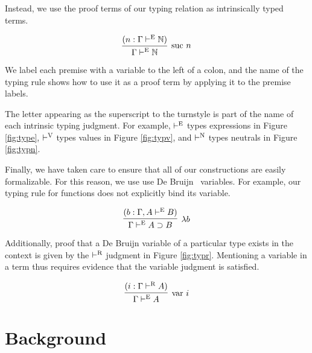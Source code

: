 \documentclass[preprint,nonatbib]{sigplanconf}
\numberwithin{mysubdfn}{mydfn}
\newcommand{\reffig}[1]{Figure \ref{fig:#1}}
\def\arr{\supset}
\def\lam{\lambda}
\def\nat{\mathbb{N}}
\newcommand{\turn}[1]{\vdash^\con{#1}}
\newcommand{\con}[1]{\textmd{#1}}
\newcommand{\fun}[1]{\textmd{#1}}
\newcommand{\type}[1]{\Gamma \turn{E} #1}
\newcommand{\ctype}[2]{\Gamma , #1 \turn{E} #2}
\newcommand{\typr}[1]{\Gamma \turn{R} #1}
\begin{document}
Instead, we use the proof terms of our typing relation as
intrinsically typed terms.

$$
\infer
  [\con{suc} ~ n]
  {\type{\nat}}
{
  (n : \type{\nat})
}
$$

We label each premise with a variable to
the left of a colon, and the name of the typing rule shows how to use
it as a proof term by applying it to the premise labels.

The letter appearing as the superscript to the turnstyle is part of
the name of each intrinsic typing judgment. For example, $\turn{E}$
types expressions in \reffig{type}, $\turn{V}$ types values in
\reffig{typv}, and $\turn{N}$ types neutrals in \reffig{typn}.

Finally, we have taken care to ensure that all of our constructions
are easily formalizable. For this reason, we
use use De Bruijn~\cite{TODO} variables. For example, our typing rule
for functions does not explicitly bind its variable.

$$
\infer
  [\lam b]
  {\type{A \arr B}}
{
  (b : \ctype{A}{B})
}
$$

Additionally, proof that a De Bruijn variable of a particular type
exists in the context is given by the $\turn{R}$ judgment in
\reffig{typr}. Mentioning a variable in a term thus requires evidence
that the variable judgment is satisfied.

$$
\infer
  [\fun{var} ~ i]
  {\type{A}}
{
  (i : \typr{A})
}
$$

\section{Background}
\label{sec:background}

\end{document}
